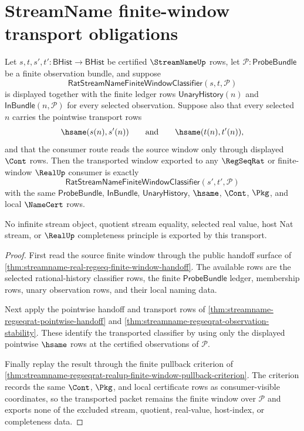 \section{StreamName finite-window transport obligations}
\label{sec:streamname-finite-window-transport-obligations}

\begin{theorem}
\label{thm:streamname-window-pointwise-transport}
Let $s,t,s',t':\mathsf{BHist}\to\mathsf{BHist}$ be certified
$\StreamNameUp$ rows, let $\mathcal{P}:\mathsf{ProbeBundle}$ be a finite
observation bundle, and suppose
$$
\mathsf{RatStreamNameFiniteWindowClassifier}(s,t,\mathcal{P})
$$
is displayed together with the finite ledger rows
$\mathsf{UnaryHistory}(n)$ and $\mathsf{InBundle}(n,\mathcal{P})$ for every
selected observation. Suppose also that every selected $n$ carries the
pointwise transport rows
$$
\hsame(s(n),s'(n))
\qquad\text{and}\qquad
\hsame(t(n),t'(n)),
$$
and that the consumer route reads the source window only through displayed
$\Cont$ rows. Then the transported window exported to any $\RegSeqRat$ or
finite-window $\RealUp$ consumer is exactly
$$
\mathsf{RatStreamNameFiniteWindowClassifier}(s',t',\mathcal{P})
$$
with the same $\mathsf{ProbeBundle}$, $\mathsf{InBundle}$,
$\mathsf{UnaryHistory}$, $\hsame$, $\Cont$, $\Pkg$, and local $\NameCert$
rows.

No infinite stream object, quotient stream equality, selected real value,
host Nat stream, or $\RealUp$ completeness principle is exported by this
transport.
\end{theorem}
\begin{proof}
First read the source finite window through the public handoff surface of
\autoref{thm:streamname-real-regseq-finite-window-handoff}. The available
rows are the selected rational-history classifier rows, the finite
$\mathsf{ProbeBundle}$ ledger, membership rows, unary observation rows, and
their local naming data.

Next apply the pointwise handoff and transport rows of
\autoref{thm:streamname-regseqrat-pointwise-handoff} and
\autoref{thm:streamname-regseqrat-observation-stability}. These identify the
transported classifier by using only the displayed pointwise $\hsame$ rows at
the certified observations of $\mathcal{P}$.

Finally replay the result through the finite pullback criterion of
\autoref{thm:streamname-regseqrat-realup-finite-window-pullback-criterion}.
The criterion records the same $\Cont$, $\Pkg$, and local certificate rows as
consumer-visible coordinates, so the transported packet remains the finite
window over $\mathcal{P}$ and exports none of the excluded stream, quotient,
real-value, host-index, or completeness data.
\end{proof}

